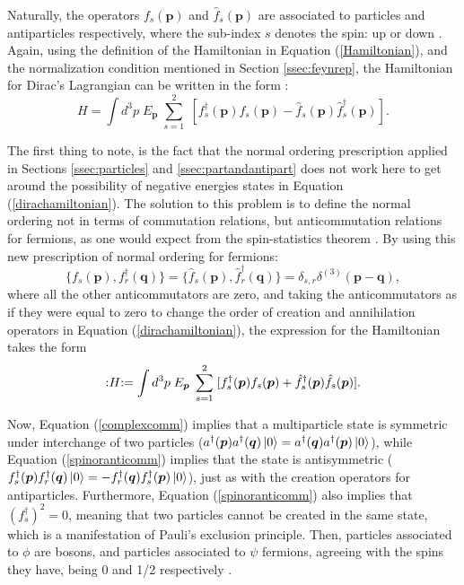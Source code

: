 Naturally, the operators $f_s(\bm{p})$ and $\hat{f}_s(\bm{p})$ are associated to particles and antiparticles respectively, where the sub-index $s$ denotes the spin: up or down \cite{Thomson}. Again, using the definition of the Hamiltonian in Equation (\ref{Hamiltonian}), and the normalization condition mentioned in Section \ref{ssec:feynrep}, the Hamiltonian for Dirac's Lagrangian can be written in the form \cite{Lahiri}:
\begin{equation}
    \label{dirachamiltonian}
    H = \int d^3p \; E_{\bm{p}} \; \sum_{s=1}^2 \; [f^{\dagger}_s(\bm{p})f_s(\bm{p}) - \hat{f}_s(\bm{p})\hat{f}^{\dagger}_s(\bm{p})].
\end{equation}

The first thing to note, is the fact that the normal ordering prescription applied in Sections \ref{ssec:particles} and \ref{ssec:partandantipart} does not work here to get around the possibility of negative energies states in Equation (\ref{dirachamiltonian}). The solution to this problem is to define the normal ordering not in terms of commutation relations, but anticommutation relations for fermions, as one would expect from the spin-statistics theorem \cite{Dirac}. By using this new prescription of normal ordering for fermions:
\begin{equation}
\label{spinoranticomm}
    \{f_s(\bm{p}),f^{\dagger}_{r}(\bm{q})\} = \{\hat{f}_s(\bm{p}),\hat{f}^{\dagger}_{r}(\bm{q})\} = \delta_{s,r}\delta^{(3)}(\bm{p} - \bm{q}),
\end{equation}
where all the other anticommutators are zero, and taking the anticommutators as if they were equal to zero to change the order of creation and annihilation operators in Equation (\ref{dirachamiltonian}), the expression for the Hamiltonian takes the form
\begin{equation*}
    :\mathrel{H}: = \int d^3p \; E_{\bm{p}} \; \sum_{s=1}^2 \; [f^{\dagger}_s(\bm{p})f_s(\bm{p}) + \hat{f}^{\dagger}_s(\bm{p})\hat{f}_s(\bm{p})].
\end{equation*}

Now, Equation (\ref{complexcomm}) implies that a multiparticle state is symmetric under interchange of two particles ($a^{\dagger}(\bm{p})a^{\dagger}(\bm{q})\ket{0} = a^{\dagger}(\bm{q})a^{\dagger}(\bm{p})\ket{0}$), while Equation (\ref{spinoranticomm}) implies that the state is antisymmetric ($f_s^{\dagger}(\bm{p})f_r^{\dagger}(\bm{q})\ket{0} = -f_r^{\dagger}(\bm{q})f_s^{\dagger}(\bm{p})\ket{0}$), just as with the creation operators for antiparticles. Furthermore, Equation (\ref{spinoranticomm}) also implies that $(f^{\dagger}_s)^2 = 0$, meaning that two particles cannot be created in the same state, which is a manifestation of Pauli's exclusion principle. Then, particles associated to $\phi$ are bosons, and particles associated to $\psi$ fermions, agreeing with the spins they have, being 0 and 1/2 respectively \cite{Lahiri}\cite{Peskin}.

